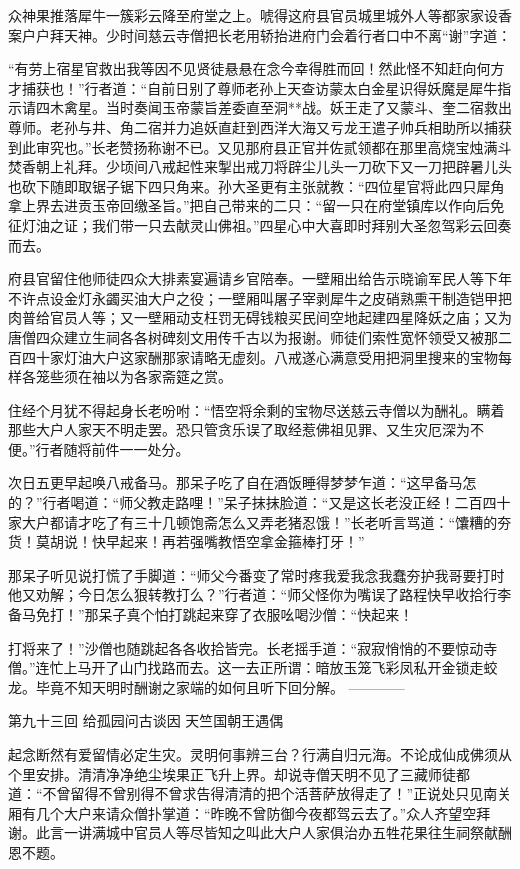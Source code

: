 \documentclass[12pt,UTF8]{ctexbook}
\begin{document}
{	众神果推落犀牛一簇彩云降至府堂之上。唬得这府县官员城里城外人等都家家设香案户户拜天神。少时间慈云寺僧把长老用轿抬进府门会着行者口中不离“谢”字道：
	
	“有劳上宿星官救出我等因不见贤徒悬悬在念今幸得胜而回！然此怪不知赶向何方才捕获也！”行者道：“自前日别了尊师老孙上天查访蒙太白金星识得妖魔是犀牛指示请四木禽星。当时奏闻玉帝蒙旨差委直至洞**战。妖王走了又蒙斗、奎二宿救出尊师。老孙与井、角二宿并力追妖直赶到西洋大海又亏龙王遣子帅兵相助所以捕获到此审究也。”长老赞扬称谢不已。又见那府县正官并佐贰领都在那里高烧宝烛满斗焚香朝上礼拜。少顷间八戒起性来掣出戒刀将辟尘儿头一刀砍下又一刀把辟暑儿头也砍下随即取锯子锯下四只角来。孙大圣更有主张就教：“四位星官将此四只犀角拿上界去进贡玉帝回缴圣旨。”把自己带来的二只：“留一只在府堂镇库以作向后免征灯油之证；我们带一只去献灵山佛祖。”四星心中大喜即时拜别大圣忽驾彩云回奏而去。
	
	府县官留住他师徒四众大排素宴遍请乡官陪奉。一壁厢出给告示晓谕军民人等下年不许点设金灯永蠲买油大户之役；一壁厢叫屠子宰剥犀牛之皮硝熟熏干制造铠甲把肉普给官员人等；又一壁厢动支枉罚无碍钱粮买民间空地起建四星降妖之庙；又为唐僧四众建立生祠各各树碑刻文用传千古以为报谢。师徒们索性宽怀领受又被那二百四十家灯油大户这家酬那家请略无虚刻。八戒遂心满意受用把洞里搜来的宝物每样各笼些须在袖以为各家斋筵之赏。
	
	住经个月犹不得起身长老吩咐：“悟空将余剩的宝物尽送慈云寺僧以为酬礼。瞒着那些大户人家天不明走罢。恐只管贪乐误了取经惹佛祖见罪、又生灾厄深为不便。”行者随将前件一一处分。
	
	次日五更早起唤八戒备马。那呆子吃了自在酒饭睡得梦梦乍道：“这早备马怎的？”行者喝道：“师父教走路哩！”呆子抹抹脸道：“又是这长老没正经！二百四十家大户都请才吃了有三十几顿饱斋怎么又弄老猪忍饿！”长老听言骂道：“馕糟的夯货！莫胡说！快早起来！再若强嘴教悟空拿金箍棒打牙！”
	
	那呆子听见说打慌了手脚道：“师父今番变了常时疼我爱我念我蠢夯护我哥要打时他又劝解；今日怎么狠转教打么？”行者道：“师父怪你为嘴误了路程快早收拾行李备马免打！”那呆子真个怕打跳起来穿了衣服吆喝沙僧：“快起来！
	
	打将来了！”沙僧也随跳起各各收拾皆完。长老摇手道：“寂寂悄悄的不要惊动寺僧。”连忙上马开了山门找路而去。这一去正所谓：暗放玉笼飞彩凤私开金锁走蛟龙。毕竟不知天明时酬谢之家端的如何且听下回分解。
	------------
	
	第九十三回 给孤园问古谈因 天竺国朝王遇偶
	
	起念断然有爱留情必定生灾。灵明何事辨三台？行满自归元海。不论成仙成佛须从个里安排。清清净净绝尘埃果正飞升上界。却说寺僧天明不见了三藏师徒都道：“不曾留得不曾别得不曾求告得清清的把个活菩萨放得走了！”正说处只见南关厢有几个大户来请众僧扑掌道：“昨晚不曾防御今夜都驾云去了。”众人齐望空拜谢。此言一讲满城中官员人等尽皆知之叫此大户人家俱治办五牲花果往生祠祭献酬恩不题。
	
}
\end{document}
